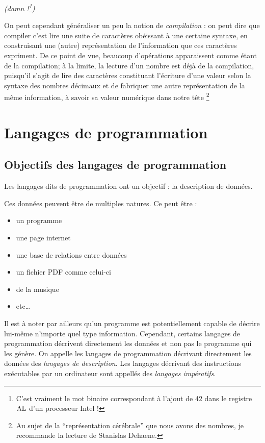 \documentclass[../../main.tex]{subfiles}
\begin{document}
\begin{center}

\textit{\footnotesize (damn !\footnote{C'est vraiment le mot binaire correspondant à l'ajout de 42 dans le registre $\rm{AL}$ d'un processeur Intel !})}
\end{center}

On peut cependant généraliser un peu la notion de \textit{compilation} : on peut dire que compiler c'est lire une suite de caractères obéissant à une certaine syntaxe, en construisant une (autre) représentation de l'information que ces caractères expriment. De ce point
de vue, beaucoup d'opérations apparaissent comme étant de la compilation; à la limite, la lecture d'un nombre est déjà de la compilation, puisqu'il s'agit de lire des caractères constituant l'écriture d'une valeur selon la syntaxe des nombres décimaux et de fabriquer une autre représentation de la même information, à savoir sa valeur numérique \og dans notre tête \fg\footnote{Au sujet de la ``représentation cérébrale'' que nous avons des nombres, je recommande la lecture de Stanislas Dehaene\cite{BosseMathsDehaene}.}
\section{Langages de programmation} \label{sec:langages_de_programmation}
\subsection{Objectifs des langages de programmation} 
\label{sub:objectifs_des_langages_de_programmation}
Les langages dits \og de programmation \fg ont un objectif : la description de données.

Ces données peuvent être de multiples natures. Ce peut être :
\begin{itemize}
	\item un programme
	\item une page internet
	\item une base de relations entre données
	\item un fichier PDF comme celui-ci
	\item de la musique
	\item etc\dots
\end{itemize}
Il est à noter par ailleurs qu'un programme est potentiellement capable de décrire lui-même n'importe quel type information. Cependant, certains langages de programmation décrivent directement les données et non pas le programme qui les génère. On appelle les langages de programmation décrivant directement les données des \textit{langages de description}. Les langages décrivant des instructions exécutables par un ordinateur sont appellés des \textit{langages impératifs}.
\end{document}
